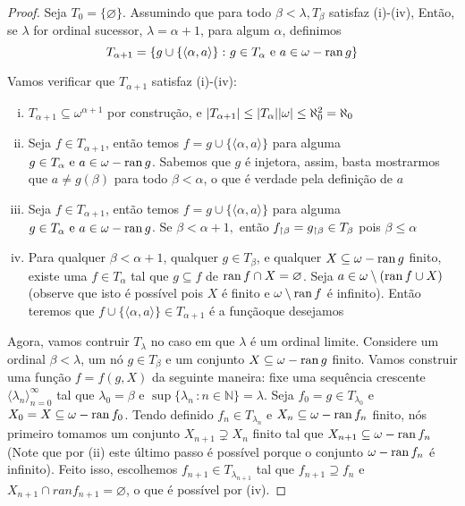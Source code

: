 \documentclass[a4paper]{article}
\begin{document}
\begin{proof}
    
    Seja \(T_0=\{\varnothing\}\). Assumindo que para todo \(\beta<\lambda,
    T_\beta\) satisfaz (i)-(iv), Então, se \(\lambda\) for ordinal sucessor,
    \(\lambda=\alpha+1\), para algum \(\alpha\), definimos
    \[T_{\alpha+1}=\{g\cup\{\langle \alpha, a\rangle\}\,\colon g\in
    T_\alpha \text{ e } a\in \omega -\operatorname{ran} g\}\]
    
    Vamos verificar que \(T_{\alpha+1}\) satisfaz (i)-(iv):
    \begin{enumerate}[(i)]
    \item \(T_{\alpha+1}\subseteq\omega^{\alpha+1}\) por construção, e
      \(\vert T_{\alpha+1} \vert\leq\vert T_\alpha \vert\vert \omega \vert \le \aleph_0^2=\aleph_0\)
      \item Seja \(f\in T_{\alpha+1}\), então temos
        \(f=g\cup\{\langle\alpha,a\rangle\}\) 
        para alguma \(g\in T_\alpha \text{ e } a\in \omega -\operatorname{ran} g\). Sabemos
        que \(g\) é injetora, assim, basta mostrarmos que \(a\neq g(\beta)\)
        para todo \(\beta<\alpha\), o que é verdade pela definição de \(a\)
      \item Seja \(f\in T_{\alpha+1}\), então temos
        \(f=g\cup\{\langle\alpha,a\rangle\}\) para
        alguma \(g\in T_\alpha \text{ e } a\in \omega -\operatorname{ran} g\). Se
        \(\beta<\alpha+1,\) então \(f_{\upharpoonright \beta}=g_{\upharpoonright \beta}\in T_\beta\)
        pois \(\beta\leq\alpha\)
      \item Para qualquer \(\beta < \alpha+1\), qualquer \(g \in T_{\beta}\), e
    qualquer \(X \subseteq \omega - \operatorname{ran} g\) finito, existe uma \(f \in
    T_{\alpha}\) tal que \(g \subseteq f\) de \(\operatorname{ran} f \cap X = \varnothing\).
    Seja \(a\in\omega\setminus(\operatorname{ran} f\cup X)\) (observe que isto
    é possível pois \(X\) é finito e \(\omega\setminus\operatorname{ran} f\) é infinito).
    Então teremos  que \(f\cup\{\langle\alpha,a\rangle\}\in T_{\alpha+1}\) é a
    funçãoque  desejamos
    \end{enumerate}
      
   Agora, vamos contruir \(T_{\lambda}\) no caso em que \(\lambda\) é um ordinal
   limite. Considere um ordinal \(\beta< \lambda\), um nó \(g \in T_{\beta}\) e
   um conjunto \(X \subseteq \omega - \operatorname{ran} g\) finito. Vamos construir uma
   função \(f = f(g, X)\) da seguinte maneira: fixe uma sequência
   crescente \(\langle \lambda_n \rangle_{n=0}^{\infty}\) tal que \(\lambda_0  =\beta\)
   e \(\sup\{\lambda_n\,\colon n \in \mathbb{N}\} = \lambda\). Seja
   \(f_0 = g \in T_{\lambda_0}\) e \(X_0 = X \subseteq \omega - \operatorname{ran} f_0\). Tendo
   definido \(f_n \in T_{\lambda_n}\) e \(X_n\subseteq \omega - \operatorname{ran} f_n\)
   finito, nós primeiro tomamos um conjunto \(X_{n+1} \supsetneq X_n\) finito tal
   que \(X_{n+1} \subseteq \omega - \operatorname{ran} f_n\) (Note que por (ii) este último passo é
   possível porque o conjunto \(\omega -\operatorname{ran} f_n\) é infinito).
   Feito isso, escolhemos \(f_{n+1} \in T_{\lambda_{n+1}}\) tal que \(f_{n+1}
   \supseteq f_n\) e  \(X_{n+1} \cap ranf_{n+1} = \varnothing\), o que é possível
   por (iv).
   

\end{proof}
\end{document}
